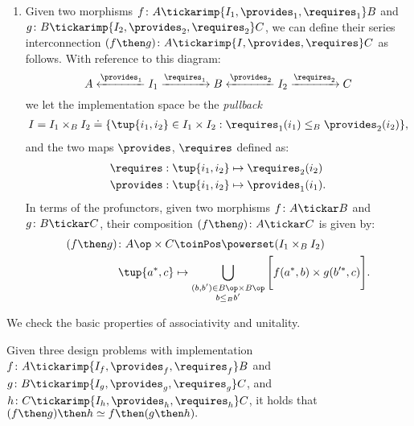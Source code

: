 \begin{definition}
\begin{enumerate}
\item Given two morphisms $f\colon A \tickarimp{I_1, \provides_1, \requires_1} B$
and $g\colon B \tickarimp{I_2, \provides_2, \requires_2} C$, we can define their
series interconnection $(f\then g)\colon A \tickarimp{I, \provides, \requires} C$ as follows.
With reference to this diagram:
\begin{equation}
    A \xleftarrow{\provides_1} I_1 \xrightarrow{\requires_1} B
      \xleftarrow{\provides_2} I_2 \xrightarrow{\requires_2} C
\end{equation}
we let the implementation space be the \emph{pullback}
\begin{equation}
\begin{aligned}
I &= I_1 \times_B I_2 \doteq \{
        \tup{i_1,i_2} \in I_1 \times I_2 :
        \requires_1(i_1) \leq_{B} \provides_2(i_2)
    \},\\
\end{aligned}
\end{equation}
and the two maps $\provides$, $\requires$ defined as:
\begin{equation}
\begin{aligned}
        \requires  &:  \tup{i_1,i_2} \mapsto \requires_2(i_2) \\
        \provides  &:  \tup{i_1,i_2} \mapsto \provides_1(i_1).
\end{aligned}
\end{equation}
In terms of the profunctors, given two morphisms $f \colon A \tickar B$ and $g \colon B \tickar C$, their composition $(f\then g) \colon A \tickar C$ is given by:
\begin{equation}
\begin{aligned}
(f\then g) \colon A\op \times C &\toinPos \powerset(I_1 \times_B I_2) \\
\tup{a^*,c} &\mapsto \bigcup_{\substack{(b,b') \in B\op \times B\op \\ b \leq_B b'}} \Bigg[ f(a^*,b) \times g(b'^*,c) \Bigg].
\end{aligned}
\end{equation}
\end{enumerate}
\end{definition}

We check the basic properties of associativity and unitality.

\begin{lemma}[associativity]
Given three design problems with implementation
    $f\colon A \tickarimp{I_f, \provides_f, \requires_f} B$
and $g\colon B \tickarimp{I_g, \provides_g, \requires_g} C$,
and $h\colon C \tickarimp{I_h, \provides_h, \requires_h} C$,
it holds that $(f\then g)\then h \simeq f\then (g\then h).$
\end{lemma}

